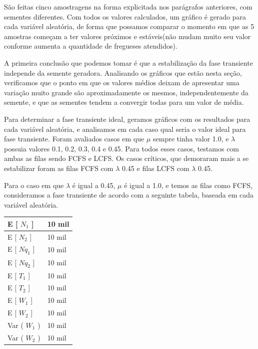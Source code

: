\documentclass[a4paper,10pt]{article}
\begin{document}
    São feitas cinco amostragens na forma explicitada nos parágrafos anteriores, com sementes diferentes. Com todos os valores calculados, um gráfico é
gerado para cada variável aleatória, de forma que possamos comparar o momento em que as 5 amostras começam a ter valores próximos e estáveis(não mudam
muito seu valor conforme aumenta a quantidade de fregueses atendidos).

    A primeira conclusão que podemos tomar é que a estabilização da fase transiente independe da semente geradora. Analisando os gráficos que estão
nesta seção, verificamos que o ponto em que os valores médios deixam de apresentar uma variação muito grande são aproximadamente os mesmos,
independentemente da semente, e que as sementes tendem a convergir todas para um valor de média.

    Para determinar a fase transiente ideal, geramos gráficos com os resultados para cada variável aleatória, e analisamos em cada caso qual
seria o valor ideal para fase transiente. Foram avaliados casos em que $\mu$ sempre tinha valor 1.0, e $\lambda$ possuia valores 0.1, 0.2, 0.3, 0.4 e 0.45. Para
todos esses casos, testamos com ambas as filas sendo FCFS e LCFS. Os casos críticos, que demoraram mais a se estabilizar foram as filas FCFS com $\lambda$ 0.45 e
filas LCFS com $\lambda$ 0.45.

    Para o caso em que $\lambda$ é igual a 0.45, $\mu$ é igual a 1.0, e temos as filas como FCFS, consideramos a fase transiente de acordo com a
seguinte tabela, baseada em cada variável aleatória.

\begin{center}
\begin{tabular} { | l | l | }
    \hline
    E [ $N_1$ ]  & 10 mil \\ \hline
    E [ $N_2$ ] & 10 mil \\ \hline
    E [ $Nq_1$ ] & 10 mil \\ \hline
    E [ $Nq_2$ ]	& 10 mil \\ \hline
    E [ $T_1$ ] & 10 mil \\ \hline
    E [ $T_2$ ] & 10 mil \\ \hline
    E [ $W_1$ ] & 10 mil \\ \hline
    E [ $W_2$ ] & 10 mil \\ \hline
    Var ( $W_1$ ) & 10 mil \\ \hline
    Var ( $W_2$ ) & 10 mil \\ \hline
\end{tabular}
\end{center}
\end{document}
